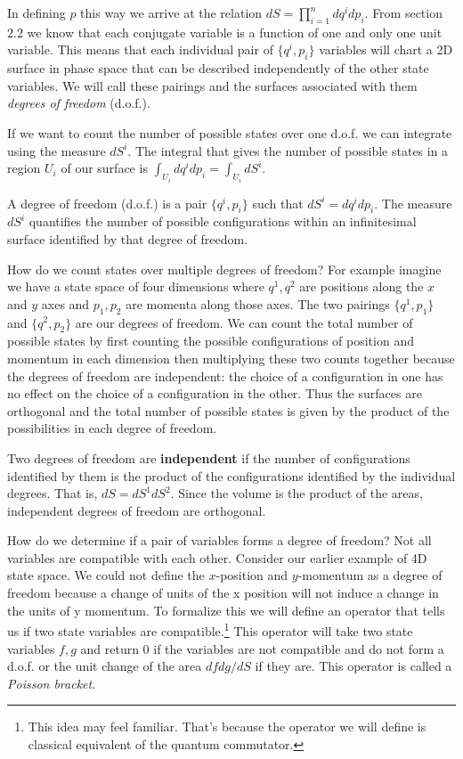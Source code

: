\documentclass{article}
\begin{document}
	In defining $p$ this way we arrive at the relation $dS = \prod \limits_{i = 1}^{n} dq^{i}dp_i$. From section $2.2$ we know that each conjugate variable is a function of one and only one unit variable. This means that each individual pair of $\{q^i,p_i\}$ variables will chart a 2D surface in phase space that can be described independently of the other state variables. We will call these pairings and the surfaces associated with them \textit{degrees of freedom} (d.o.f.).
	
	If we want to count the number of possible states over one d.o.f. we can integrate using the measure $dS^i$. The integral that gives the number of possible states in a region $U_i$ of our surface is $\int_{U_i} dq^i dp_i = \int_{U_i} dS^i$.

\begin{defn}
	A degree of freedom (d.o.f.) is a pair $\{q^i,p_i \}$ such that $dS^i = dq^i dp_i$. The measure $dS^i$ quantifies the number of possible configurations within an infinitesimal surface identified by that degree of freedom.
\end{defn}

	How do we count states over multiple degrees of freedom? For example imagine we have a state space of four dimensions where $q^1,q^2$ are positions along the $x$ and $y$ axes and $p_1,p_2$ are momenta along those axes. The two pairings $\{q^1,p_1 \}$ and $\{q^2,p_2 \}$ are our degrees of freedom. We can count the total number of possible states by first counting the possible configurations of position and momentum in each dimension then multiplying these two counts together because the degrees of freedom are independent: the choice of a configuration in one has no effect on the choice of a configuration in the other. Thus the surfaces are orthogonal and the total number of possible states is given by the product of the possibilities in each degree of freedom.

\begin{defn}
	Two degrees of freedom are \textbf{independent} if the number of configurations identified by them is the product of the configurations identified by the individual degrees. That is, $dS = dS^1 dS^2$. Since the volume is the product of the areas, independent degrees of freedom are orthogonal.
\end{defn}

	How do we determine if a pair of variables forms a degree of freedom? Not all variables are compatible with each other. Consider our earlier example of 4D state space. We could not define the $x$-position and $y$-momentum as a degree of freedom because a change of units of the x position will not induce a change in the units of y momentum. To formalize this we will define an operator that tells us if two state variables are compatible.\footnote{This idea may feel familiar. That's because the operator we will define is classical equivalent of the quantum commutator.} This operator will take two state variables $f,g$ and return 0 if the variables are not compatible and do not form a d.o.f. or the unit change of the area $dfdg/dS$ if they are. This operator is called a \textit{Poisson bracket}.
\end{document}
